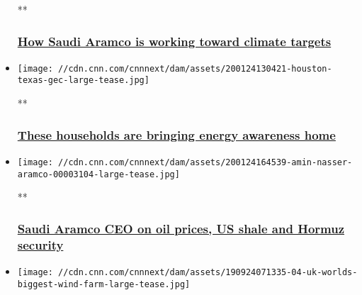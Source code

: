 \begin{itemize}
  **

  \hypertarget{how-saudi-aramco-is-working-toward-climate-targets}{%
  \subsubsection{\texorpdfstring{\href{/videos/business/2020/03/17/saudi-arabia-carbon-capture-utilization-storage-gec.cnn-business}{How
  Saudi Aramco is working toward climate
  targets}}{How Saudi Aramco is working toward climate targets}}\label{how-saudi-aramco-is-working-toward-climate-targets}}
\item
  \href{/videos/business/2020/01/24/us-household-energy-consumption-gec.cnn-business}{}

  \texttt{[image: //cdn.cnn.com/cnnnext/dam/assets/200124130421-houston-texas-gec-large-tease.jpg]}

  **

  \hypertarget{these-households-are-bringing-energy-awareness-home}{%
  \subsubsection{\texorpdfstring{\href{/videos/business/2020/01/24/us-household-energy-consumption-gec.cnn-business}{These
  households are bringing energy awareness
  home}}{These households are bringing energy awareness home}}\label{these-households-are-bringing-energy-awareness-home}}
\item
  \href{/videos/business/2020/01/24/amin-nasser-aramco.cnn}{}

  \texttt{[image: //cdn.cnn.com/cnnnext/dam/assets/200124164539-amin-nasser-aramco-00003104-large-tease.jpg]}

  **

  \hypertarget{saudi-aramco-ceo-on-oil-prices-us-shale-and-hormuz-security}{%
  \subsubsection{\texorpdfstring{\href{/videos/business/2020/01/24/amin-nasser-aramco.cnn}{Saudi
  Aramco CEO on oil prices, US shale and Hormuz
  security}}{Saudi Aramco CEO on oil prices, US shale and Hormuz security}}\label{saudi-aramco-ceo-on-oil-prices-us-shale-and-hormuz-security}}
\item
  \href{/2019/09/25/business/worlds-largest-wind-farm/index.html}{}

  \texttt{[image: //cdn.cnn.com/cnnnext/dam/assets/190924071335-04-uk-worlds-biggest-wind-farm-large-tease.jpg]}


\end{itemize}
